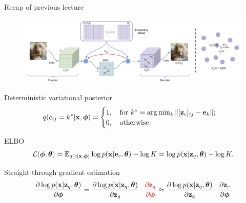 \begin{frame}{Recap of previous lecture}
	\begin{figure}
		\centering
		\includegraphics[width=0.85\linewidth]{figs/vqvae}
	\end{figure}
	\vspace{-0.3cm}
	\begin{block}{Deterministic variational posterior}
		\vspace{-0.8cm}
		\[
			q(c_{ij} = k^* | \mathbf{x}, \boldsymbol{\phi}) = \begin{cases}
				1 , \quad \text{for } k^* = \operatorname*{arg\,min}_k \| [\mathbf{z}_e]_{ij} - \mathbf{e}_k \|; \\
				0, \quad \text{otherwise}.
			\end{cases}
		\]
		\vspace{-0.8cm}
	\end{block}
	\begin{block}{ELBO}
		\vspace{-0.6cm}
		\[
			\mathcal{L} (\boldsymbol{\phi}, \boldsymbol{\theta})  = \mathbb{E}_{q(c | \mathbf{x}, \boldsymbol{\phi})} \log p(\mathbf{x} | \mathbf{e}_{c} , \boldsymbol{\theta}) - \log K =  \log p(\mathbf{x} | \mathbf{z}_q, \boldsymbol{\theta}) - \log K.
		\]
		\vspace{-0.6cm}
	\end{block}
	\begin{block}{Straight-through gradient estimation}
		\vspace{-0.6cm}
		\[
			\frac{\partial \log p(\mathbf{x} | \mathbf{z}_q , \boldsymbol{\theta})}{\partial \boldsymbol{\phi}} = \frac{\partial \log p(\mathbf{x} | \mathbf{z}_q, \boldsymbol{\theta})}{\partial \mathbf{z}_q} \cdot {\color{red}\frac{\partial \mathbf{z}_q}{\partial \boldsymbol{\phi}}} \approx \frac{\partial \log p(\mathbf{x} | \mathbf{z}_q, \boldsymbol{\theta})}{\partial \mathbf{z}_q} \cdot \frac{\partial \mathbf{z}_e}{\partial \boldsymbol{\phi}}
		\]
	\end{block}
\end{frame}
